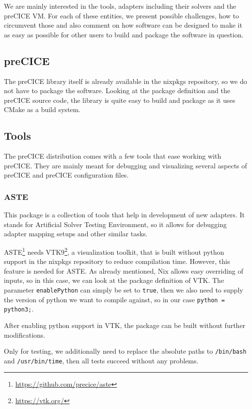 \documentclass{eceasst}
\begin{document}
We are mainly interested in the tools, adapters including their solvers and the preCICE VM.
For each of these entities, we present possible challenges, how to circumvent those and also comment on how software can be designed to make it as easy as possible for other users to build and package the software in question.

\subsection{preCICE}

The preCICE library itself is already available in the nixpkgs repository, so we do not have to package the software.
Looking at the package definition and the preCICE source code, the library is quite easy to build and package as it uses CMake as a build system.

\subsection{Tools}

The preCICE distribution comes with a few tools that ease working with preCICE.
They are mainly meant for debugging and visualizing several aspects of preCICE and preCICE configuration files.

\subsubsection{ASTE}

This package is a collection of tools that help in development of new adapters.
It stands for Artificial Solver Testing Environment, so it allows for debugging adapter mapping setups and other similar tasks.

ASTE\footnote{\url{https://github.com/precice/aste}} needs VTK9\footnote{\url{https://vtk.org/}}, a visualization toolkit, that is built without python support in the nixpkgs repository to reduce compilation time.
However, this feature is needed for ASTE.
As already mentioned, Nix allows easy overriding of inputs, so in this case, we can look at the package definition of VTK.
The parameter \texttt{enablePython} can simply be set to \texttt{true}, then we also need to supply the version of python we want to compile against, so in our case \texttt{python = python3;}.

After enabling python support in VTK, the package can be built without further modifications.

Only for testing, we additionally need to replace the absolute paths to \texttt{/bin/bash} and \texttt{/usr/bin/time}, then all tests succeed without any problems.
\end{document}
